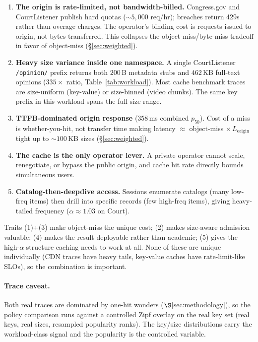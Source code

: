 \documentclass[letterpaper,twocolumn,10pt]{article}
\begin{document}
\begin{enumerate}[leftmargin=*,itemsep=1pt,topsep=2pt]
  \item \textbf{The origin is rate-limited, not bandwidth-billed.}
    Congress.gov and CourtListener publish hard quotas
    ($\sim 5{,}000$ req/hr); breaches return 429s rather than
    overage charges. The operator's binding cost is requests
    issued to origin, not bytes transferred. This collapses the
    object-miss/byte-miss tradeoff in favor of object-miss (\S\ref{sec:weighted}).
  \item \textbf{Heavy size variance inside one namespace.}
    A single CourtListener \texttt{/opinion/} prefix returns both
    $200$\,B metadata stubs and $462$\,KB full-text opinions
    ($335\times$ ratio, Table~\ref{tab:workload}). Most cache
    benchmark traces are size-uniform (key-value) or size-binned
    (video chunks). The same key prefix in this workload spans the
    full size range.
  \item \textbf{TTFB-dominated origin response} ($358$\,ms combined
    $p_{50}$). Cost of a miss is whether-you-hit, not transfer time
    making latency $\approx$ object-miss $\times \, L_{\text{origin}}$
    tight up to $\sim 100$\,KB sizes (\S\ref{sec:weighted}).
  \item \textbf{The cache is the only operator lever.} A private
    operator cannot scale, renegotiate, or bypass the public origin, and
    cache hit rate directly bounds simultaneous users.
  \item \textbf{Catalog-then-deepdive access.} Sessions enumerate
    catalogs (many low-freq items) then drill into specific records
    (few high-freq items), giving heavy-tailed frequency
    ($\alpha \approx 1.03$ on Court).
\end{enumerate}

Traits (1)+(3) make object-miss the unique cost; (2) makes size-aware
admission valuable; (4) makes the result deployable rather than
academic; (5) gives the high-$\alpha$ structure caching needs to
work at all. None of these are unique individually (CDN
traces have heavy tails, key-value caches have rate-limit-like
SLOs), so the combination is important.

\paragraph{Trace caveat.} Both real traces are dominated
by one-hit wonders ($\S$\ref{sec:methodology}), so the policy
comparison runs against a controlled Zipf overlay on the real key set
(real keys, real sizes, resampled popularity ranks). The
key/size distributions carry the workload-class signal and the
popularity is the controlled variable.
\end{document}
